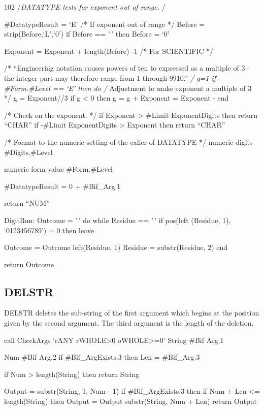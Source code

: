 102 /\emph{DATATYPE tests for exponent out of range. }/

\#DatatypeResult = `E' /* If exponent out of range */ Before =
strip(Before,`L',`0') if Before == '\,' then Before = `0'

Exponent = Exponent + length(Before) -1 /* For SCIENTIFIC */

/* ``Engineering notation causes powers of ten to expressed as a
multiple of 3 - the integer part may therefore range from 1 through
9910.'' \emph{/ g=1 if \#Form.\#Level == `E' then do /} Adjustment to
make exponent a multiple of 3 */ g = Exponent//3 if g \textless{} 0 then
g = g + Exponent = Exponent - end

/* Check on the exponent. */ if Exponent \textgreater{} \#Limit
ExponentDigits then return ``CHAR'' if -\#Limit ExponentDigits
\textgreater{} Exponent then return ``CHAR''

/* Format to the numeric setting of the caller of DATATYPE */ numeric
digits \#Digits.\#Level

numeric form value \#Form.\#Level

\#DatatypeResult = 0 + \#Bif\_Arg.1

return ``NUM''

DigitRun: Outcome = '\,' do while Residue == '\,' if pos(left (Residue,
1), `0123456789') = 0 then leave

Outcome = Outcome \textbar\textbar{} left(Residue, 1) Residue =
substr(Residue, 2) end

return Outcome

\hypertarget{delstr}{%
\subsection{DELSTR}\label{delstr}}

DELSTR deletes the sub-string of the first argument which begins at the
position given by the second argument. The third argument is the length
of the deletion.

call CheckArgs `rANY rWHOLE\textgreater0 oWHOLE\textgreater=0' String
\#Bif Arg.1

Num \#Bif Arg.2 if \#Bif\_ArgExists.3 then Len = \#Bif\_Arg.3

if Num \textgreater{} length(String) then return String

Output = substr(String, 1, Num - 1) if \#Bif\_ArgExists.3 then if Num +
Len \textless= length(String) then Output = Output \textbar\textbar{}
substr(String, Num + Len) return Output

